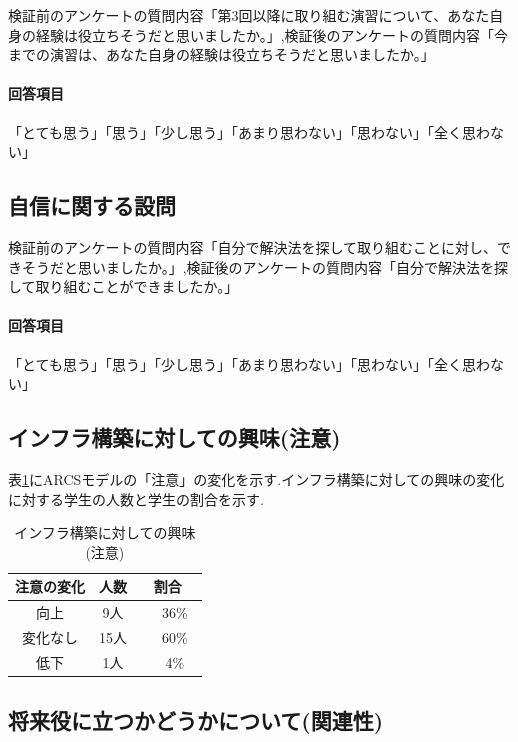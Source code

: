 \documentclass[11pt, a4paper]{jreport}
\begin{document}
検証前のアンケートの質問内容「第3回以降に取り組む演習について、あなた自身の経験は役立ちそうだと思いましたか。」,検証後のアンケートの質問内容「今までの演習は、あなた自身の経験は役立ちそうだと思いましたか。」

\paragraph{回答項目}

「とても思う」「思う」「少し思う」「あまり思わない」「思わない」「全く思わない」

\subsection{自信に関する設問}

検証前のアンケートの質問内容「自分で解決法を探して取り組むことに対し、できそうだと思いましたか。」,検証後のアンケートの質問内容「自分で解決法を探して取り組むことができましたか。」

\paragraph{回答項目}

「とても思う」「思う」「少し思う」「あまり思わない」「思わない」「全く思わない」

\subsection{インフラ構築に対しての興味(注意)}

表\ref{tab:kyoumi}にARCSモデルの「注意」の変化を示す.インフラ構築に対しての興味の変化に対する学生の人数と学生の割合を示す.

\begin{table}[H]
\caption{インフラ構築に対しての興味(注意)}
\label{tab:kyoumi}
\centering
\begin{tabular}{|c|c|c|} \hline
注意の変化 & 人数 & 割合\\ \hline
向上 & 9人 &　36\%　\\ \hline
変化なし & 15人 &　60\%　\\ \hline
低下 & 1人 &　4\%　\\ \hline
\end{tabular}
\end{table}

\subsection{将来役に立つかどうかについて(関連性)}
\end{document}
